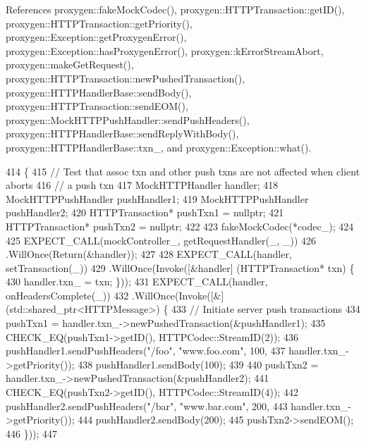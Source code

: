 References proxygen\+::fake\+Mock\+Codec(), proxygen\+::\+H\+T\+T\+P\+Transaction\+::get\+I\+D(), proxygen\+::\+H\+T\+T\+P\+Transaction\+::get\+Priority(), proxygen\+::\+Exception\+::get\+Proxygen\+Error(), proxygen\+::\+Exception\+::has\+Proxygen\+Error(), proxygen\+::k\+Error\+Stream\+Abort, proxygen\+::make\+Get\+Request(), proxygen\+::\+H\+T\+T\+P\+Transaction\+::new\+Pushed\+Transaction(), proxygen\+::\+H\+T\+T\+P\+Handler\+Base\+::send\+Body(), proxygen\+::\+H\+T\+T\+P\+Transaction\+::send\+E\+O\+M(), proxygen\+::\+Mock\+H\+T\+T\+P\+Push\+Handler\+::send\+Push\+Headers(), proxygen\+::\+H\+T\+T\+P\+Handler\+Base\+::send\+Reply\+With\+Body(), proxygen\+::\+H\+T\+T\+P\+Handler\+Base\+::txn\+\_\+, and proxygen\+::\+Exception\+::what().


\begin{DoxyCode}
414                                                  \{
415   \textcolor{comment}{// Test that assoc txn and other push txns are not affected when client aborts}
416   \textcolor{comment}{// a push txn}
417   MockHTTPHandler handler;
418   MockHTTPPushHandler pushHandler1;
419   MockHTTPPushHandler pushHandler2;
420   HTTPTransaction* pushTxn1 = \textcolor{keyword}{nullptr};
421   HTTPTransaction* pushTxn2 = \textcolor{keyword}{nullptr};
422 
423   fakeMockCodec(*codec\_);
424 
425   EXPECT\_CALL(mockController\_, getRequestHandler(\_, \_))
426     .WillOnce(Return(&handler));
427 
428   EXPECT\_CALL(handler, setTransaction(\_))
429     .WillOnce(Invoke([&handler] (HTTPTransaction* txn) \{
430           handler.txn_ = txn; \}));
431   EXPECT\_CALL(handler, onHeadersComplete(\_))
432     .WillOnce(Invoke([&] (std::shared\_ptr<HTTPMessage>) \{
433           \textcolor{comment}{// Initiate server push transactions}
434           pushTxn1 = handler.txn_->newPushedTransaction(&pushHandler1);
435           CHECK\_EQ(pushTxn1->getID(), HTTPCodec::StreamID(2));
436           pushHandler1.sendPushHeaders(\textcolor{stringliteral}{"/foo"}, \textcolor{stringliteral}{"www.foo.com"}, 100,
437                                       handler.txn_->getPriority());
438           pushHandler1.sendBody(100);
439 
440           pushTxn2 = handler.txn_->newPushedTransaction(&pushHandler2);
441           CHECK\_EQ(pushTxn2->getID(), HTTPCodec::StreamID(4));
442           pushHandler2.sendPushHeaders(\textcolor{stringliteral}{"/bar"}, \textcolor{stringliteral}{"www.bar.com"}, 200,
443                                        handler.txn_->getPriority());
444           pushHandler2.sendBody(200);
445           pushTxn2->sendEOM();
446         \}));
447 

\end{DoxyCode}

